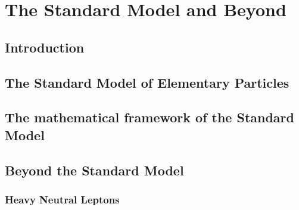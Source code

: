 
\chapter{The Standard Model and Beyond} %

\label{Chapter1} %


\section{Introduction}

\section{The Standard Model of Elementary Particles}
\section{The mathematical framework of the Standard Model}

\clearpage

\section{Beyond the Standard Model}
\clearpage
\subsection{Heavy Neutral Leptons}
